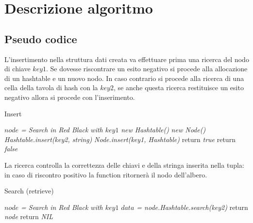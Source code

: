 \def\baselinestretch{1}
\section{Descrizione algoritmo}
\def\baselinestretch{1.66}
\thispagestyle{headings}
\subsection{Pseudo codice}

L'insertimento nella struttura dati creata va effettuare prima una ricerca
del nodo di chiave $key1$. Se dovesse riscontrare un esito negativo si procede
alla allocazione di un hashtable e un nuovo nodo. In caso contrario si procede alla ricerca
di una cella della tavola di hash con la $key2$, se anche questa ricerca restituisce un esito
negativo allora si procede con l'inserimento.

\BlankLine
\IncMargin{1.5em}
\begin{algorithm}[H]
\caption{Insert}
\emph{$node$ = Search in Red Black with $key1$}\;
 {
    \emph{new Hashtable()}\;
    \emph{new Node()}\;
    \emph{Hashtable.insert(key2, string)}\;
    \emph{Node.insert(key1, Hashtable)}\;
    return \emph{true}\;
}
return \emph{false}\;
\end{algorithm}\newpage
\indent La ricerca controlla la correttezza delle chiavi e della stringa inserita nella tupla:
in caso di riscontro positivo la function ritorner\`a il nodo dell'albero.
\BlankLine
\IncMargin{1.5em}
\begin{algorithm}[H]
\caption{Search (retrieve) }
\emph{$node$ = Search in Red Black with $key1$}\;
 {
    \emph{$data$ = node.Hashtable.search(key2)}\;
     {
        return \emph{node}\;
    }
}
return \emph{NIL}\;
\end{algorithm}\newpage

